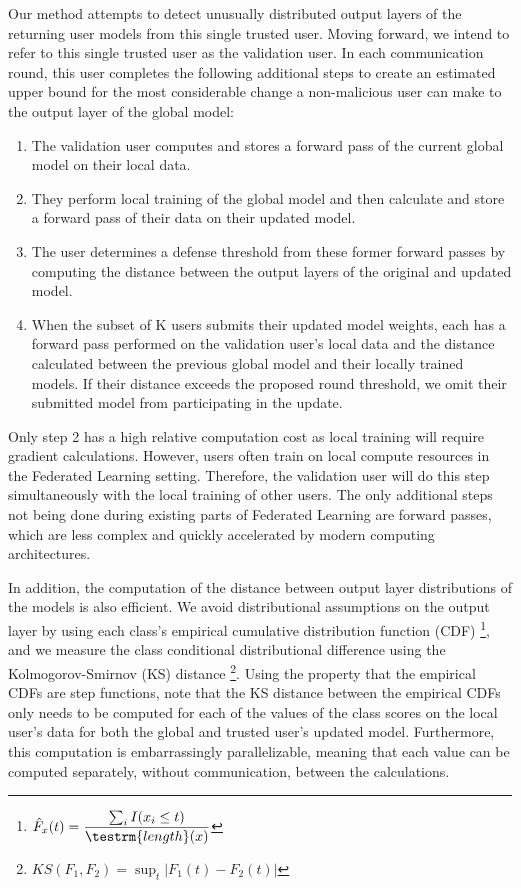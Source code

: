 \documentclass{article} %
\begin{document}
Our method attempts to detect unusually distributed output layers of the returning user models from this single trusted user. Moving forward, we intend to refer to this single trusted user as the validation user. In each communication round, this user completes the following additional steps to create an estimated upper bound for the most considerable change a non-malicious user can make to the output layer of the global model:
\begin{enumerate}
    \item The validation user computes and stores a forward pass of the current global model on their local data.
    \item They perform local training of the global model and then calculate and store a forward pass of their data on their updated model.
    \item The user determines a defense threshold from these former forward passes by computing the distance between the output layers of the original and updated model.
    \item When the subset of K users submits their updated model weights, each has a forward pass performed on the validation user's local data and the distance calculated between the previous global model and their locally trained models. If their distance exceeds the proposed round threshold, we omit their submitted model from participating in the update. 
\end{enumerate}

Only step 2 has a high relative computation cost as local training will require gradient calculations. However, users often train on local compute resources in the Federated Learning setting. Therefore, the validation user will do this step simultaneously with the local training of other users. The only additional steps not being done during existing parts of Federated Learning are forward passes, which are less complex and quickly accelerated by modern computing architectures.

In addition, the computation of the distance between output layer distributions of the models is also efficient. We avoid distributional assumptions on the output layer by using each class's empirical cumulative distribution function (CDF) \footnote{$\hat F_x(t) = \dfrac{\sum_i I(x_i \leq t)}{\testrm{length}(x)}$}, and we measure the class conditional distributional difference using the Kolmogorov-Smirnov (KS) distance \footnote{$KS(F_1, F_2) = \sup_t | F_1(t) - F_2(t) |$}. Using the property that the empirical CDFs are step functions, note that the KS distance between the empirical CDFs only needs to be computed for each of the values of the class scores on the local user's data for both the global and trusted user's updated model. Furthermore, this computation is embarrassingly parallelizable, meaning that each value can be computed separately, without communication, between the calculations. 
\end{document}
